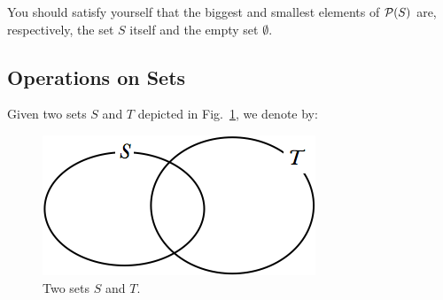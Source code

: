 \noindent
You should satisfy yourself that the biggest and smallest elements of
${\cal P}(S)$ are, respectively, the set $S$ itself and the empty set
$\emptyset$.

\subsection{Operations on Sets}
\label{sec:set-operations}

Given two sets $S$ and $T$ depicted in Fig.~\ref{fig:setInitial}, we denote by:
\begin{figure}[htb]
\begin{center}
        \includegraphics[scale=0.4]{FiguresMaths/setInitial}
        \caption{Two sets $S$ and $T$.}
        \label{fig:setInitial}
\end{center}
\end{figure}
